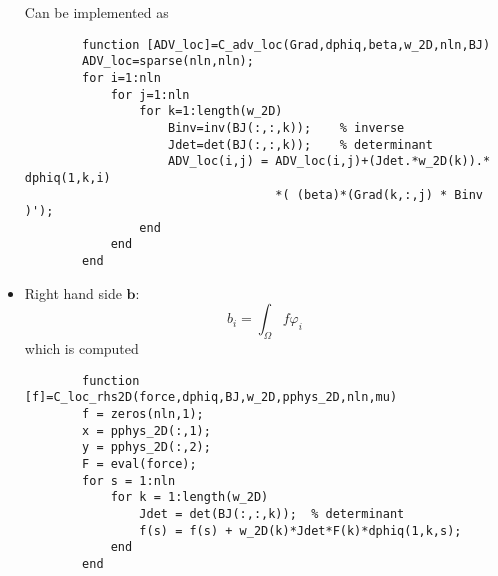 \documentclass[a4paper,11pt]{article}
\theoremstyle{break}
\newcommand{\vect}[1]{\textbf{#1}}
\let\phi\varphi
\numberwithin{equation}{section}
\begin{document}
\begin{itemize}
    Can be implemented as 
    \begin{verbatim}
        function [ADV_loc]=C_adv_loc(Grad,dphiq,beta,w_2D,nln,BJ)
        ADV_loc=sparse(nln,nln);
        for i=1:nln
            for j=1:nln
                for k=1:length(w_2D)
                    Binv=inv(BJ(:,:,k));    % inverse
                    Jdet=det(BJ(:,:,k));    % determinant 
                    ADV_loc(i,j) = ADV_loc(i,j)+(Jdet.*w_2D(k)).* dphiq(1,k,i)
                                   *( (beta)*(Grad(k,:,j) * Binv )');
                end
            end
        end
    \end{verbatim}
    \item Right hand side \(\vect{b}\):
    \[
        b_i = \int_\Omega f\phi_i
    \]
    which is computed 
    \begin{verbatim}
        function [f]=C_loc_rhs2D(force,dphiq,BJ,w_2D,pphys_2D,nln,mu)
        f = zeros(nln,1);
        x = pphys_2D(:,1);
        y = pphys_2D(:,2);
        F = eval(force);
        for s = 1:nln
            for k = 1:length(w_2D)
                Jdet = det(BJ(:,:,k));  % determinant 
                f(s) = f(s) + w_2D(k)*Jdet*F(k)*dphiq(1,k,s);
            end    
        end
    \end{verbatim}
\end{itemize}
\end{document}
